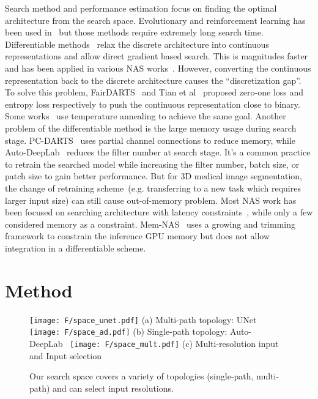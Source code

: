 \documentclass[final]{cvpr}
\begin{document}
Search method and performance estimation focus on finding the optimal architecture from the search space. Evolutionary and reinforcement learning has been used in~\cite{zoph2016nas,real2019regularized} but those methods require extremely long search time. Differentiable methods~\cite{liu2018darts,liu2019auto} relax the discrete architecture into continuous representations and allow direct gradient based search. This is magnitudes faster and has been applied in various NAS works~\cite{liu2018darts,liu2019auto,xu2019pc,zhu2019vnas,yan2020ms}. However, converting the continuous representation back to the discrete architecture causes the ``discretization gap''. To solve this problem, FairDARTS~\cite{chu2019fair} and Tian et al~\cite{tian2020discretization} proposed zero-one loss and entropy loss respectively to push the continuous representation close to binary. Some works~\cite{nayman2019xnas, hu2020dsnas} use temperature annealing to achieve the same goal. Another problem of the differentiable method is the large memory usage during search stage. PC-DARTS~\cite{xu2019pc} uses partial channel connections to reduce memory, while Auto-DeepLab~\cite{liu2019auto} reduces the filter number at search stage. It's a common practice to retrain the searched model while increasing the filter number, batch size, or patch size to gain better performance. But for 3D medical image segmentation, the change of retraining scheme~(e.g. transferring to a new task which requires larger input size) can still cause out-of-memory problem. Most NAS work has been focused on searching architecture with latency constraints~\cite{cai2018proxylessnas,chen2019fasterseg,li2019partial,Shaw_2019_ICCV}, while only a few considered memory as a constraint. Mem-NAS~\cite{liu2020memnas} uses a growing and trimming framework to constrain the inference GPU memory but does not allow integration in a differentiable scheme.   

\section{Method}


\begin{figure}
\begin{center}
\texttt{[image: F/space\_unet.pdf]}
(a) Multi-path topology: UNet~\cite{ronneberger2015u}
\texttt{[image: F/space\_ad.pdf]}
(b) Single-path topology: Auto-DeepLab~\cite{liu2019auto}
\texttt{[image: F/space\_mult.pdf]}
(c) Multi-resolution input~\cite{Lin_2017_CVPR} and Input selection
\end{center}
  \caption{Our search space covers a variety of topologies (single-path, multi-path) and can select input resolutions.}
\label{fig:ss_example}
\end{figure}
\end{document}
